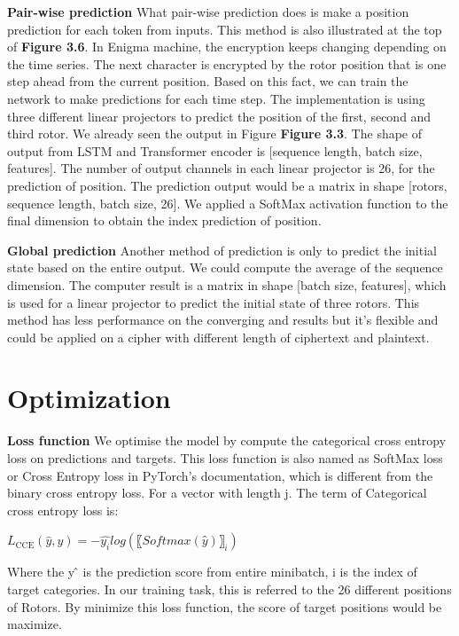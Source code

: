 \noindent\textbf{Pair-wise prediction} \qquad		What pair-wise prediction does is make a position prediction for each token from inputs. This method is also illustrated at the top of \textbf{Figure 3.6}. In Enigma machine, the encryption keeps changing depending on the time series. The next character is encrypted by the rotor position that is one step ahead from the current position. Based on this fact, we can train the network to make predictions for each time step. The implementation is using three different linear projectors to predict the position of the first, second and third rotor. We already seen the output in Figure \textbf{Figure 3.3}. The shape of output from LSTM and Transformer encoder is [sequence length, batch size, features]. The number of output channels in each linear projector is 26, for the prediction of position. The prediction output would be a matrix in shape [rotors, sequence length, batch size, 26]. We applied a SoftMax activation function to the final dimension to obtain the index prediction of position.

\noindent\textbf{Global prediction} \qquad		Another method of prediction is only to predict the initial state based on the entire output. We could compute the average of the sequence dimension. The computer result is a matrix in shape [batch size, features], which is used for a linear projector to predict the initial state of three rotors. This method has less performance on the converging and results but it’s flexible and could be applied on a cipher with different length of ciphertext and plaintext.

\section{Optimization}
\noindent\textbf{Loss function} \qquad	We optimise the model by compute the categorical cross entropy loss on predictions and targets. This loss function is also named as SoftMax loss or Cross Entropy loss in PyTorch’s documentation, which is different from the binary cross entropy loss. For a vector with length j. The term of Categorical cross entropy loss is:

\begin{center}
\(L_\text{CCE} (\hat{y}, y)= -  \hat{y_i}log(〖Softmax(y ̂)〗_i )\)
\end{center}


Where the y ̂ is the prediction score from entire minibatch, i is the index of target categories. In our training task, this is referred to the 26 different positions of Rotors. By minimize this loss function, the score of target positions would be maximize. 


